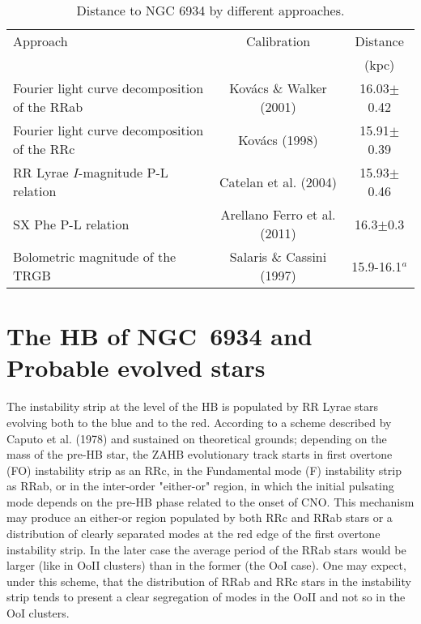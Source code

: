 \documentclass[journal]{rmaa}
\newcommand{\1}{\'{\i}}
\begin{document}
\begin{table*}[t]
\footnotesize
\caption{Distance to NGC 6934 by different approaches.}
\centering
\begin{tabular}{lcc}
  \hline
  Approach & Calibration & Distance\\
   &   & (kpc)\\
  \hline
  Fourier light curve decomposition of the RRab & Kov\'acs \& Walker (2001) & 16.03$\pm$0.42\\
  Fourier light curve decomposition of the RRc & Kov\'acs (1998) & 15.91$\pm$0.39\\
  RR Lyrae $I$-magnitude P-L relation& Catelan et al. (2004) & 15.93$\pm$0.46\\
  SX Phe P-L relation & Arellano Ferro et al. (2011) & 16.3$\pm$0.3\\
  Bolometric magnitude of the TRGB & Salaris \& Cassini (1997) & 15.9-16.1$^a$ \\
  \hline
\end{tabular}
\label{Sum_Dis}
{}
\end{table*}


\section{The HB of NGC~6934 and Probable evolved stars}
\label{sec:HB}

The instability strip at the level of the HB is populated by RR Lyrae stars evolving
both to the blue and to the red. According to a scheme described by Caputo et al.
(1978) and sustained on theoretical grounds; depending on the mass of the pre-HB
star, the ZAHB evolutionary track starts in first overtone (FO) instability strip as
an RRc, in the Fundamental mode (F) instability strip as RRab, or in the inter-order
"either-or" region, in which the initial pulsating mode depends on the pre-HB phase
related to the onset of CNO. This mechanism may produce an either-or region populated
by both RRc and RRab stars or a distribution of clearly separated modes at the red
edge of the first overtone instability strip. In the later case the average period of
the RRab stars would be larger (like in OoII clusters) than in the former (the OoI
case). One may expect, under this scheme, that the distribution of RRab and
RRc stars in the instability strip tends to present a clear segregation of modes in
the OoII and not so in the OoI clusters.
\end{document}
